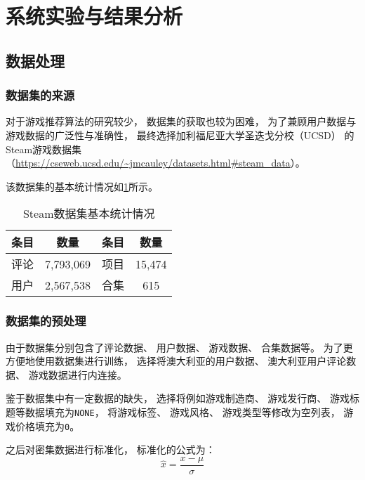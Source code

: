 \section{系统实验与结果分析}

\subsection{数据处理}

\subsubsection{数据集的来源}

对于游戏推荐算法的研究较少，
数据集的获取也较为困难，
为了兼顾用户数据与游戏数据的广泛性与准确性，
最终选择加利福尼亚大学圣迭戈分校（UCSD）
的Steam游戏数据集
（\url{https://cseweb.ucsd.edu/~jmcauley/datasets.html#steam_data}）。

该数据集的基本统计情况如\cref{tb:dataset}所示。

\begin{table}[!htbp]
	\begin{center}
		\caption{Steam数据集基本统计情况}\label{tb:dataset}
		\begin{tabular}{cccc}
			\toprule
			条目 & 数量        & 条目 & 数量     \\
			\midrule
			评论 & 7,793,069 & 项目 & 15,474 \\
			用户 & 2,567,538 & 合集 & 615    \\
			\bottomrule
		\end{tabular}
	\end{center}
\end{table}

\subsubsection{数据集的预处理}

由于数据集分别包含了评论数据、
用户数据、
游戏数据、
合集数据等。
为了更方便地使用数据集进行训练，
选择将澳大利亚的用户数据、
澳大利亚用户评论数据、
游戏数据进行内连接。

鉴于数据集中有一定数据的缺失，
选择将例如游戏制造商、
游戏发行商、
游戏标题等数据填充为\verb|NONE|，
将游戏标签、
游戏风格、
游戏类型等修改为空列表，
游戏价格填充为\verb|0|。

之后对密集数据进行标准化，
标准化的公式为：
\begin{equation}
	\hat{x} = \frac{x-\mu}{\sigma}
\end{equation}

